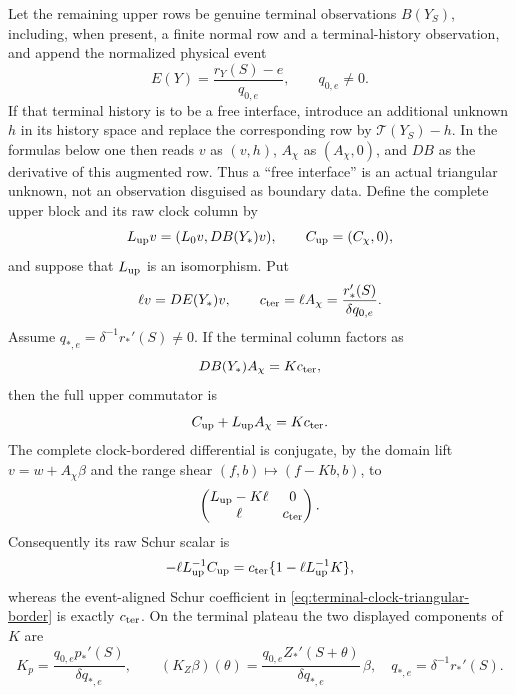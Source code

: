 \begin{lemma}
Let the remaining upper rows be genuine terminal observations \(B(Y_S)\),
including, when present, a finite normal row and a terminal-history
observation, and append the normalized physical event
\begin{equation}
 E(Y)=\frac{r_Y(S)-e}{q_{0,e}},\qquad q_{0,e}\ne0.          \label{eq:terminal-clock-event-row}
\end{equation}
If that terminal history is to be a free interface, introduce an
additional unknown \(h\) in its history space and replace the corresponding
row by \(\mathcal T(Y_S)-h\).  In the formulas below one then reads
\(v\) as \((v,h)\), \(A_\chi\) as \((A_\chi,0)\), and \(DB\) as the
derivative of this augmented row.  Thus a ``free interface'' is an actual
triangular unknown, not an observation disguised as boundary data.
Define the complete upper block and its raw clock column by
\begin{equation}
 L_{\rm up}v=(L_0v,DB(Y_*)v),\qquad
 C_{\rm up}=(C_\chi,0),                           \label{eq:terminal-clock-upper-block}
\end{equation}
and suppose that \(L_{\rm up}\) is an isomorphism.  Put
\begin{equation}
 \ell v=DE(Y_*)v,\qquad
 c_{\rm ter}=\ell A_\chi
 =\frac{r_*'(S)}{\delta q_{0,e}}.               \label{eq:terminal-clock-event-coefficient}
\end{equation}
Assume \(q_{*,e}=\delta^{-1}r_*'(S)\ne0\).  If the terminal column
factors as
\begin{equation}
 DB(Y_*)A_\chi=Kc_{\rm ter},                    \label{eq:terminal-clock-column-factorization}
\end{equation}
then the full upper commutator is
\begin{equation}
 C_{\rm up}+L_{\rm up}A_\chi=Kc_{\rm ter}.      \label{eq:terminal-clock-full-commutator}
\end{equation}
The complete clock-bordered differential is conjugate, by the domain
lift \(v=w+A_\chi\beta\) and the range shear
\((f,b)\mapsto(f-Kb,b)\), to
\begin{equation}
 \begin{pmatrix}L_{\rm up}-K\ell&0\\ \ell&c_{\rm ter}\end{pmatrix}.
                                                        \label{eq:terminal-clock-triangular-border}
\end{equation}
Consequently its raw Schur scalar is
\begin{equation}
 -\ell L_{\rm up}^{-1}C_{\rm up}
 =c_{\rm ter}\{1-\ell L_{\rm up}^{-1}K\},    \label{eq:terminal-clock-raw-schur}
\end{equation}
whereas the event-aligned Schur coefficient in
\cref{eq:terminal-clock-triangular-border} is exactly \(c_{\rm ter}\).
On the terminal plateau the two displayed components of \(K\) are
\begin{equation}
 K_p=\frac{q_{0,e}p_*'(S)}{\delta q_{*,e}},\qquad
 (K_Z\beta)(\theta)
 =\frac{q_{0,e}Z_*'(S+\theta)}{\delta q_{*,e}}\,\beta,
 \quad q_{*,e}=\delta^{-1}r_*'(S).              \label{eq:terminal-clock-physical-shears}
\end{equation}


\end{lemma}
